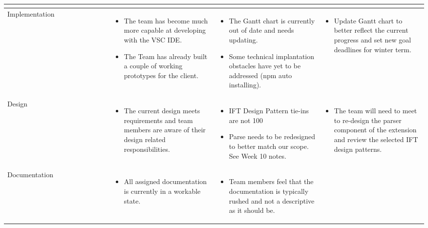 \documentclass[letterpaper,10pt,titlepage,draftclsnofoot,onecolumn,onesided] {IEEEtran}
\begin{document}
\begin{center}
\begin{tabular}{ |  p{0.25\linewidth}  |  p{0.25\linewidth}  | p{0.25\linewidth} | p{0.25\linewidth} |}
\begin{itemize}
			\end{itemize} 
		\\ \hline
			Implementation 
		& 
			\begin{itemize}
				\item The team has become much more capable at developing with the VSC IDE.
				\item The Team has already built a couple of working prototypes for the client.
			\end{itemize}
		& 
			\begin{itemize}
				\item The Gantt chart is currently out of date and needs updating.
				\item Some technical implantation obstacles have yet to be addressed (npm auto installing).
			\end{itemize}
		&
			\begin{itemize}
				\item Update Gantt chart to better reflect the current progress and set new goal deadlines for winter term.
			\end{itemize} 
		\\ \hline
			Design 
		& 
			\begin{itemize}
				\item The current design meets requirements and team members are aware of their design related responsibilities.
			\end{itemize}
		& 
			\begin{itemize}
				\item IFT Design Pattern tie-ins are not 100%
				\item Parse needs to be redesigned to better match our scope. See Week 10 notes.
			\end{itemize}
		&
			\begin{itemize}
				\item The team will need to meet to re-design the parser component of the extension and review the selected IFT design patterns.
			\end{itemize} 
		\\ \hline
			Documentation 
		& 
			\begin{itemize}
				\item All assigned documentation is currently in a workable state.
			\end{itemize}
		& 
			\begin{itemize}
				\item Team members feel that the documentation is typically rushed and not a descriptive as it should be.

\end{itemize}
\end{tabular}
\end{center}
\end{document}

